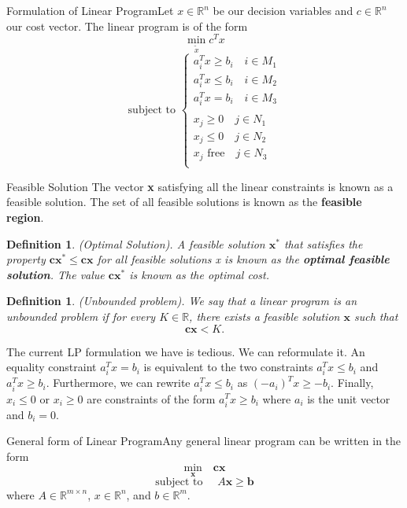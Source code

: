 \documentclass[twoside]{article}
\newtheorem{definition}[theorem]{Definition}
\begin{document}
\begin{definition_exam}{Formulation of Linear Program}{}Let $x \in \mathbb{R}^n$ be our decision variables and $c \in \mathbb{R}^n$ our cost vector. The linear program is of the form 
$$
\min_{\tilde{x}} c^Tx
$$
$$
\text{subject to }
\begin{cases}
a_i^Tx \geq b_i \quad i \in M_1\\
a_i^Tx \leq b_i \quad i \in M_2\\
a_i^Tx = b_i \quad i \in M_3\\\\
x_j \geq 0 \quad j \in N_1\\
x_j \leq 0 \quad j \in N_2\\
x_j \text{ free} \quad j \in N_3\\
\end{cases}
$$
\end{definition_exam}


\begin{definition_exam}{Feasible Solution}{} The vector \textbf{x} satisfying all the linear constraints is known as a feasible solution. The set of all feasible solutions is known as the \textbf{feasible region}.
\end{definition_exam}

\begin{definition}(Optimal Solution). A feasible solution $\textbf{x}^*$ that satisfies the property $\textbf{c}\textbf{x}^* \leq \textbf{c}\textbf{x}$ for all feasible solutions x is known as the \textbf{optimal feasible solution}. The value $\textbf{c}\textbf{x}^*$ is known as the optimal cost.
\end{definition}

\begin{definition}(Unbounded problem). We say that a linear program is an unbounded problem if for every $K \in \mathbb{R}$, there exists a feasible solution $\textbf{x}$ such that 
$$
\textbf{c}\textbf{x} < K.
$$
\end{definition}

The current LP formulation we have is tedious. We can reformulate it. An equality constraint $a_i^Tx = b_i$ is equivalent to the two constraints $a_i^Tx \leq b_i$ and $a_i^Tx \geq b_i$. Furthermore, we can rewrite $a_i^Tx \leq b_i$ as $(-a_i)^Tx \geq -b_i.$ Finally, $x_i \leq 0$ or $x_i \geq 0$ are constraints of the form $a_i^Tx \geq b_i$ where $a_i$ is the unit vector and $b_i = 0.$

\begin{theorem_exam}{General form of Linear Program}{}Any general linear program can be written in the form 
$$
\min_{\textbf{x}}\quad \textbf{c}\textbf{x}
$$
$$
\text{subject to } \quad A\textbf{x} \geq \textbf{b}
$$
where $A \in \mathbb{R}^{m \times n}$, $x \in \mathbb{R}^n$, and $b \in \mathbb{R}^m$.
\end{theorem_exam}
\end{document}
